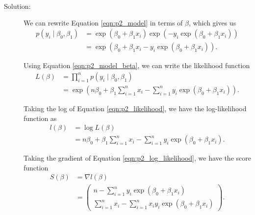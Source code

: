 \documentclass[letterpaper,11pt]{article}
\begin{document}
\begin{enumerate}
\begin{enumerate}
    \begin{description}
    \item[Solution:] We can rewrite Equation \ref{eqn:p2_model} in terms of
      $\beta$, which gives us
      \begin{align}
        p\left(y_i \mid \beta_0,\beta_1\right)
        &= \exp\left(\beta_0 + \beta_1x_i\right)
        \exp\left(- y_i\exp\left(\beta_0 + \beta_1x_i\right)\right) \nonumber\\
        &=
        \exp\left(
          \beta_0 + \beta_1x_i - y_i\exp\left(\beta_0 + \beta_1x_i\right)\right)
        \label{eqn:p2_model_beta}.
      \end{align}

      Using Equation \ref{eqn:p2_model_beta}, we can write the likelihood
      function
      \begin{align}
        L\left(\beta\right)
        &= \prod_{i=1}^n p\left(y_i \mid \beta_0,\beta_1\right) \nonumber\\
        &= \exp\left(
          n\beta_0 + \beta_1\sum_{i=1}^n x_i
          -
          \sum_{i=1}^n y_i\exp\left(\beta_0 + \beta_1x_i\right)
          \right).
          \label{eqn:p2_likelihood}
      \end{align}

      Taking the log of Equation \ref{eqn:p2_likelihood}, we have the
      log-likelihood function as
      \begin{align}
        l\left(\beta\right)
        &= \log L\left(\beta\right) \nonumber\\
        &= n\beta_0 + \beta_1\sum_{i=1}^nx_i -
          \sum_{i=1}^ny_i\exp\left(\beta_0 + \beta_1x_i\right).
          \label{eqn:p2_log_likelihood}
      \end{align}

      Taking the gradient of Equation \ref{eqn:p2_log_likelihood}, we have the
      score function
      \begin{align}
        S\left(\beta\right)
        &= \nabla l\left(\beta\right) \nonumber\\
        &= \begin{pmatrix}
          n - \sum_{i=1}^ny_i\exp\left(\beta_0 + \beta_1x_i\right) \\
          \sum_{i=1}^nx_i - \sum_{i=1}^n x_iy_i\exp\left(\beta_0 + \beta_1x_i\right)
        \end{pmatrix}.
        \label{eqn:p2_score}
      \end{align}


\end{description}
\end{enumerate}
\end{enumerate}
\end{document}
